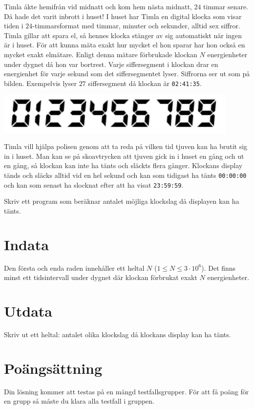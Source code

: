 Timla åkte hemifrån vid midnatt och kom hem nästa midnatt, $24$ timmar senare. Då hade det varit inbrott i huset! 
I huset har Timla en digital klocka som visar tiden i $24$-timmarsformat med timmar, minuter och sekunder,
alltid sex siffror. Timla gillar att spara el, så hennes klocka stänger av sig automatiskt när ingen är i huset.
För att kunna mäta exakt hur mycket el hon sparar har hon också en mycket exakt elmätare.
Enligt denna mätare förbrukade klockan $N$ energienheter under dygnet då hon var bortrest.
Varje siffersegment i klockan drar en energienhet för varje sekund som det siffersegmentet lyser.
Siffrorna ser ut som på bilden. Exempelvis lyser $27$ siffersegment då klockan är \texttt{02:41:35}.

\begin{center}
  \includegraphics[width=12cm]{illustration.png}
\end{center}

Timla vill hjälpa polisen genom att ta reda på vilken tid tjuven kan ha brutit sig in i huset.
Man kan se på skoavtrycken att tjuven gick in i huset en gång och ut en gång, så klockan kan inte
ha tänts och släckts flera gånger. Klockans display tänds och släcks alltid vid en hel sekund och
kan som tidigast ha tänts \texttt{00:00:00} och kan som senast ha slocknat efter att ha visat \texttt{23:59:59}.

Skriv ett program som beräknar antalet möjliga klockslag då displayen kan ha tänts. 

\section*{Indata}
Den första och enda raden innehåller ett heltal $N$ ($1 \leq N \leq 3 \cdot 10^6$). Det finns minst ett tidsintervall under dygnet där klockan förbrukat exakt $N$ energienheter.

\section*{Utdata}
Skriv ut ett heltal: antalet olika klockslag då klockans display kan ha tänts. 

\section*{Poängsättning}
Din lösning kommer att testas på en mängd testfallsgrupper.
För att få poäng för en grupp så måste du klara alla testfall i gruppen.

